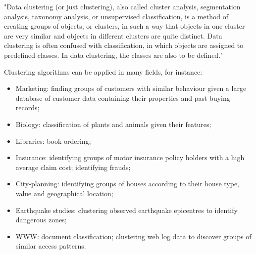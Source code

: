 "Data clustering (or just clustering), also called cluster analysis, segmentation analysis, taxonomy analysis, or unsupervised classification, is a method of creating groups of objects, or clusters, in such a way that objects in one cluster are very similar and objects in different clusters are quite distinct. Data clustering is often confused with classification, in which objects are assigned to predefined classes. In data clustering, the classes are also to be defined."~\cite{data_clustering_book}


Clustering algorithms can be applied in many fields, for instance:

\begin{itemize}
\item Marketing: finding groups of customers with similar behaviour given a large database of customer data containing their properties and past buying records;
\item Biology: classification of plants and animals given their features;
\item Libraries: book ordering;
\item Insurance: identifying groups of motor insurance policy holders with a high average claim cost; identifying frauds;
\item City-planning: identifying groups of houses according to their house type, value and geographical location;
\item Earthquake studies: clustering observed earthquake epicentres to identify dangerous zones;
\item WWW: document classification; clustering web log data to discover groups of similar access patterns.
\end{itemize}